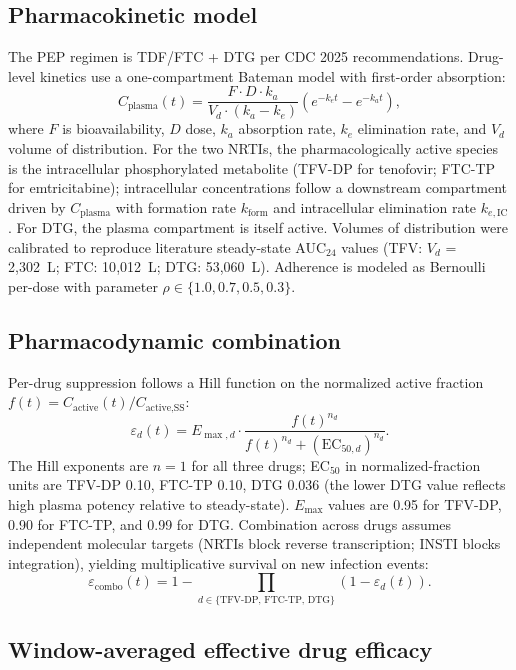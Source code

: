 \documentclass[11pt]{article}
\theoremstyle{definition}
\theoremstyle{remark}
\begin{document}
\subsection{Pharmacokinetic model}

The PEP regimen is TDF/FTC + DTG per CDC 2025 recommendations\cite{tanner2025_si}. Drug-level kinetics use a one-compartment Bateman model with first-order absorption:
\[
C_{\text{plasma}}(t) = \frac{F \cdot D \cdot k_a}{V_d \cdot (k_a - k_e)} \left( e^{-k_e t} - e^{-k_a t} \right),
\]
where $F$ is bioavailability, $D$ dose, $k_a$ absorption rate, $k_e$ elimination rate, and $V_d$ volume of distribution. For the two NRTIs, the pharmacologically active species is the intracellular phosphorylated metabolite (TFV-DP for tenofovir; FTC-TP for emtricitabine); intracellular concentrations follow a downstream compartment driven by $C_{\text{plasma}}$ with formation rate $k_{\text{form}}$ and intracellular elimination rate $k_{e,\text{IC}}$. For DTG, the plasma compartment is itself active. Volumes of distribution were calibrated to reproduce literature steady-state AUC$_{24}$ values (TFV: $V_d$ = 2{,}302~L; FTC: 10{,}012~L; DTG: 53{,}060~L). Adherence is modeled as Bernoulli per-dose with parameter $\rho \in \{1.0, 0.7, 0.5, 0.3\}$.

\subsection{Pharmacodynamic combination}

Per-drug suppression follows a Hill function on the normalized active fraction $f(t) = C_{\text{active}}(t) / C_{\text{active,SS}}$:
\[
\varepsilon_d(t) = E_{\max,d} \cdot \frac{f(t)^{n_d}}{f(t)^{n_d} + (\text{EC}_{50,d})^{n_d}}.
\]
The Hill exponents are $n = 1$ for all three drugs; EC$_{50}$ in normalized-fraction units are TFV-DP 0.10, FTC-TP 0.10, DTG 0.036 (the lower DTG value reflects high plasma potency relative to steady-state). $E_{\max}$ values are 0.95 for TFV-DP, 0.90 for FTC-TP, and 0.99 for DTG. Combination across drugs assumes independent molecular targets (NRTIs block reverse transcription; INSTI blocks integration), yielding multiplicative survival on new infection events:
\[
\varepsilon_{\text{combo}}(t) = 1 - \prod_{d \in \{\text{TFV-DP, FTC-TP, DTG}\}} \left(1 - \varepsilon_d(t)\right).
\]

\subsection{Window-averaged effective drug efficacy}
\end{document}
